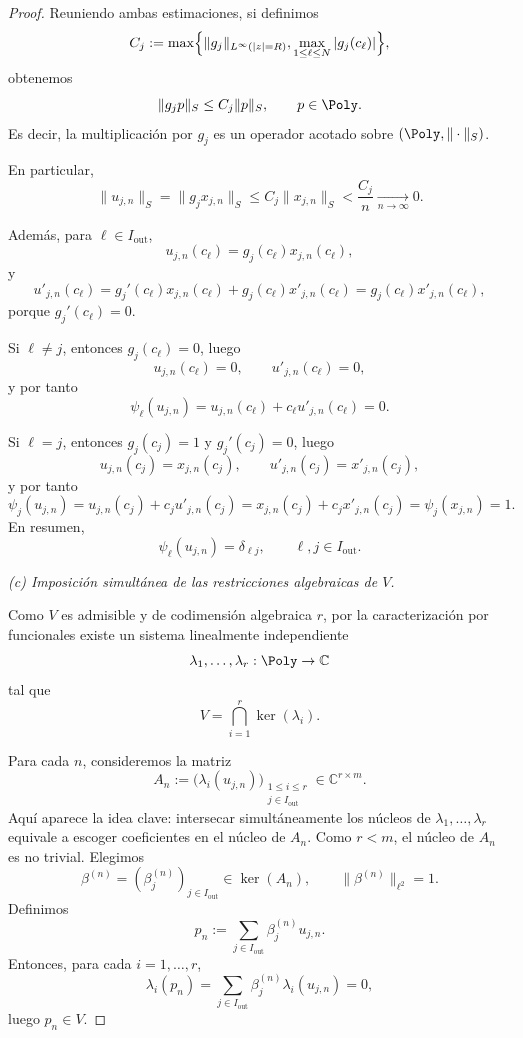 \begin{proof}
	Reuniendo ambas estimaciones, si definimos
	\[
		C_j:=
		\max\Bigl\{
		\|g_j\|_{L^\infty(|z|=R)},
		\max_{1\le \ell\le N}|g_j(c_\ell)|
		\Bigr\},
	\]
	obtenemos
	\[
		\|g_jp\|_S\le C_j\|p\|_S,
		\qquad p\in\Poly.
	\]
	Es decir, la multiplicación por $g_j$ es un operador acotado sobre
	$(\Poly,\|\cdot\|_S)$.

	En particular,
	\[
		\|u_{j,n}\|_S=\|g_jx_{j,n}\|_S\le C_j\|x_{j,n}\|_S<\frac{C_j}{n}\xrightarrow[n\to\infty]{}0.
	\]

	Además, para $\ell\in I_{\mathrm{out}}$,
	\[
		u_{j,n}(c_\ell)=g_j(c_\ell)x_{j,n}(c_\ell),
	\]
	y
	\[
		u'_{j,n}(c_\ell)=g_j'(c_\ell)x_{j,n}(c_\ell)+g_j(c_\ell)x'_{j,n}(c_\ell)
		=g_j(c_\ell)x'_{j,n}(c_\ell),
	\]
	porque $g_j'(c_\ell)=0$.

	Si $\ell\neq j$, entonces $g_j(c_\ell)=0$, luego
	\[
		u_{j,n}(c_\ell)=0,
		\qquad
		u'_{j,n}(c_\ell)=0,
	\]
	y por tanto
	\[
		\psi_\ell(u_{j,n})=u_{j,n}(c_\ell)+c_\ell u'_{j,n}(c_\ell)=0.
	\]

	Si $\ell=j$, entonces $g_j(c_j)=1$ y $g_j'(c_j)=0$, luego
	\[
		u_{j,n}(c_j)=x_{j,n}(c_j),
		\qquad
		u'_{j,n}(c_j)=x'_{j,n}(c_j),
	\]
	y por tanto
	\[
		\psi_j(u_{j,n})
		=
		u_{j,n}(c_j)+c_j u'_{j,n}(c_j)
		=
		x_{j,n}(c_j)+c_jx'_{j,n}(c_j)
		=
		\psi_j(x_{j,n})=1.
	\]
	En resumen,
	\[
		\psi_\ell(u_{j,n})=\delta_{\ell j},
		\qquad \ell,j\in I_{\mathrm{out}}.
	\]

	\smallskip
	\noindent
	\emph{(c) Imposición simultánea de las restricciones algebraicas de $V$.}

	Como $V$ es admisible y de codimensión algebraica $r$, por la caracterización por
	funcionales existe un sistema linealmente independiente
	\[
		\lambda_1,\dots,\lambda_r:\Poly\to\mathbb C
	\]
	tal que
	\[
		V=\bigcap_{i=1}^r \ker(\lambda_i).
	\]

	Para cada $n$, consideremos la matriz
	\[
		A_n:=\bigl(\lambda_i(u_{j,n})\bigr)_{
		\substack{1\le i\le r\\ j\in I_{\mathrm{out}}}}
		\in \mathbb C^{r\times m}.
	\]
	Aquí aparece la idea clave: intersecar simultáneamente los núcleos de
	$\lambda_1,\dots,\lambda_r$ equivale a escoger coeficientes en el núcleo de $A_n$.
	Como $r<m$, el núcleo de $A_n$ es no trivial. Elegimos
	\[
		\beta^{(n)}=(\beta_j^{(n)})_{j\in I_{\mathrm{out}}}\in \ker(A_n),
		\qquad
		\|\beta^{(n)}\|_{\ell^2}=1.
	\]
	Definimos
	\[
		p_n:=\sum_{j\in I_{\mathrm{out}}}\beta_j^{(n)}u_{j,n}.
	\]
	Entonces, para cada $i=1,\dots,r$,
	\[
		\lambda_i(p_n)=\sum_{j\in I_{\mathrm{out}}}\beta_j^{(n)}\lambda_i(u_{j,n})=0,
	\]
	luego $p_n\in V$.


\end{proof}
